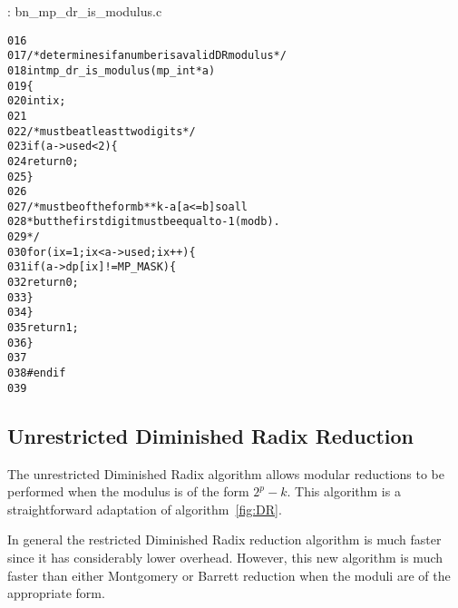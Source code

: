\documentclass[b5paper]{book}
\begin{document}
\vspace{+3mm}\begin{small}
\hspace{-5.1mm}{\bf File}: bn\_mp\_dr\_is\_modulus.c
\vspace{-3mm}
\begin{alltt}
016   
017   /* determines if a number is a valid DR modulus */
018   int mp_dr_is_modulus(mp_int *a)
019   \{
020      int ix;
021   
022      /* must be at least two digits */
023      if (a->used < 2) \{
024         return 0;
025      \}
026   
027      /* must be of the form b**k - a [a <= b] so all
028       * but the first digit must be equal to -1 (mod b).
029       */
030      for (ix = 1; ix < a->used; ix++) \{
031          if (a->dp[ix] != MP_MASK) \{
032             return 0;
033          \}
034      \}
035      return 1;
036   \}
037   
038   #endif
039   
\end{alltt}
\end{small}

\subsection{Unrestricted Diminished Radix Reduction}
The unrestricted Diminished Radix algorithm allows modular reductions to be performed when the modulus is of the form $2^p - k$.  This algorithm
is a straightforward adaptation of algorithm~\ref{fig:DR}.

In general the restricted Diminished Radix reduction algorithm is much faster since it has considerably lower overhead.  However, this new
algorithm is much faster than either Montgomery or Barrett reduction when the moduli are of the appropriate form.
\end{document}
